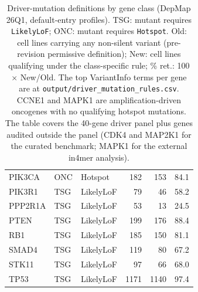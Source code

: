 \documentclass[11pt,a4paper]{article}
\begin{document}
\begin{table}[H]
\begin{tabular}{lllrrr}
PIK3CA & ONC & Hotspot & 182 & 153 & 84.1 \\
PIK3R1 & TSG & LikelyLoF & 79 & 46 & 58.2 \\
PPP2R1A & TSG & LikelyLoF & 53 & 13 & 24.5 \\
PTEN & TSG & LikelyLoF & 199 & 176 & 88.4 \\
RB1 & TSG & LikelyLoF & 185 & 150 & 81.1 \\
SMAD4 & TSG & LikelyLoF & 119 & 80 & 67.2 \\
STK11 & TSG & LikelyLoF & 97 & 66 & 68.0 \\
TP53 & TSG & LikelyLoF & 1171 & 1140 & 97.4 \\
\bottomrule
\end{tabular}
\caption{Driver-mutation definitions by gene class (DepMap 26Q1, default-entry profiles).
TSG: mutant requires \texttt{LikelyLoF}; ONC: mutant requires \texttt{Hotspot}.
Old: cell lines carrying any non-silent variant (pre-revision permissive definition);
New: cell lines qualifying under the class-specific rule; \% ret.: 100 $\times$ New/Old.
The top VariantInfo terms per gene are at \texttt{output/driver\_mutation\_rules.csv}.
CCNE1 and MAPK1 are amplification-driven oncogenes with no qualifying hotspot mutations. The table covers the 40-gene driver panel plus genes audited outside the panel (CDK4 and MAP2K1 for the curated benchmark; MAPK1 for the external in4mer analysis).}
\end{table}

\end{document}
